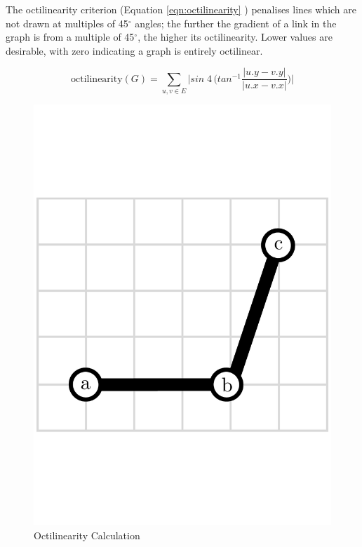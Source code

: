 The octilinearity criterion (Equation \ref{eqn:octilinearity} \citep{AutomaticMetroMapLayoutThesis}) penalises lines which are not drawn at multiples of 45$^{\circ}$ angles; the further the gradient of a link in the graph is from a multiple of 45$^{\circ}$, the higher its octilinearity. Lower values are desirable, with zero indicating a graph is entirely octilinear. 

\begin{equation}
	\text{octilinearity}(G) = \sum_{u, v\in E}\bigg|sin\;4\,\bigg(tan^{-1}\frac{|u.y - v.y|}{|u.x - v.x|}\bigg)\bigg|
\label{eqn:octilinearity}
\end{equation}

\begin{figure}[h]
\centering
\begin{minipage}{.4\textwidth}
  \includegraphics[width=.9\linewidth]{img/implementation/octilinearity.pdf}\caption{Octilinearity Calculation\label{fig:octilinearity}}
  \end{minipage}\hspace{0.5cm}\begin{minipage}{.55\textwidth}


\end{minipage}
\end{figure}
